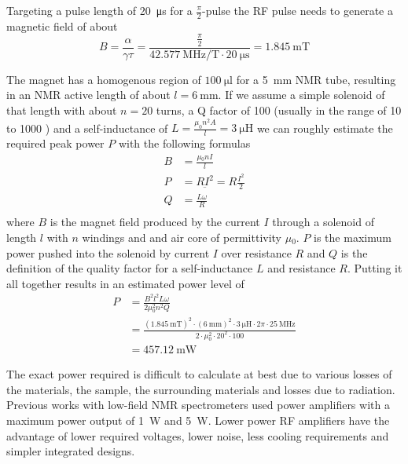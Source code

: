 Targeting a pulse length of \qty{20}{\micro\second} for a  \(\frac{\pi}{2}\)-pulse the RF pulse needs to generate a magnetic field of about
\[
    B = \frac{\alpha}{\gamma\tau} = \frac{\frac{\pi}{2}}{\qty{42.577}{\mega\hertz\per\tesla}\cdot{}\qty{20}{\micro\second}} = \qty{1.845}{\milli\tesla}
\]

The magnet has a homogenous region of \(\qty{100}{\micro\litre}\) for a \qty{5}{\milli\meter} NMR tube, resulting in an NMR active length of about \(l = \qty{6}{\milli\meter}\). If we assume a simple solenoid of that length with about \(n = 20\) turns, a Q factor of 100 (usually in the range of 10 to 1000 ) and a self-inductance of \(L = \frac{\mu_0n^2A}{l} = \qty{3}{\micro\henry}\)\sidenote{} we can roughly estimate the required peak power \(P\) with the following formulas \cite{mispelterNMRProbeheadsBiophysical2015}
\begin{align}
    B & = \frac{\mu{}_0nI}{l}              \\
    P & = R\underbar{I}^2 = R\frac{I^2}{2} \\
    Q & = \frac{L\omega}{R}                \\
\end{align}
where \(B\) is the magnet field produced by the current \(I\) through a solenoid of length \(l\) with \(n\) windings and and air core of permittivity \(\mu{}_0\). \(P\) is the maximum power pushed into the solenoid by current \(I\) over resistance \(R\) and \(Q\) is the definition of the quality factor for a self-inductance \(L\) and resistance \(R\). Putting it all together results in an estimated power level of
\begin{align}
    P & = \frac{B^2l^2L\omega}{2\mu{}_0^2n^2Q}                                                                                                                                              \\
      & = \frac{(\qty{1.845}{\milli\tesla})^2 \cdot (\qty{6}{\milli\metre})^2 \cdot \qty{3}{\micro\henry} \cdot 2\pi{} \cdot \qty{25}{\mega\hertz}}{2 \cdot \mu{}_0^2 \cdot 20^2 \cdot 100} \\
      & = \qty{457.12}{\milli\watt}
\end{align}

The exact power required is difficult to calculate at best due to various losses of the materials, the sample, the surrounding materials and losses due to radiation. Previous works with low-field NMR spectrometers used power amplifiers with a maximum power output of \qty{1}{\watt}\cite{chenUltralowCostNMR2015} and \qty{5}{W}\cite{louis-josephDesigningBuildingLowcost2019}. Lower power RF amplifiers have the advantage of lower required voltages, lower noise, less cooling requirements and simpler integrated designs.

